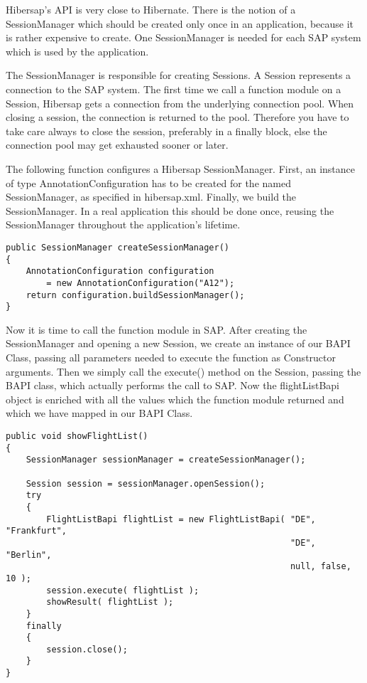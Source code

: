 Hibersap's API is very close to Hibernate.
There is the notion of a SessionManager which should be created only once in an application,
because it is rather expensive to create.
One SessionManager is needed for each SAP system which is used by the application.

The SessionManager is responsible for creating Sessions.
A Session represents a connection to the SAP system. The first time we call a function module
on a Session, Hibersap gets a connection from the underlying connection pool.
When closing a session, the connection is returned to the pool. Therefore you have to take care
always to close the session, preferably in a finally block, else the connection pool may
get exhausted sooner or later.

The following function configures a Hibersap SessionManager. First, an instance of type AnnotationConfiguration has to be created for the named SessionManager, as specified in hibersap.xml. Finally, we build the SessionManager. In a real application this should be done once, reusing the SessionManager throughout the application's lifetime.

\begin{lstlisting}[caption=Creating the SessionManager]
public SessionManager createSessionManager()
{
    AnnotationConfiguration configuration 
        = new AnnotationConfiguration("A12");
    return configuration.buildSessionManager();
}
\end{lstlisting}

Now it is time to call the function module in SAP.
After creating the SessionManager and opening a new Session, we create an instance of our
BAPI Class, passing all parameters needed to execute the function as Constructor arguments.
Then we simply call the execute() method on the Session, passing the BAPI class,
which actually performs the call to SAP. Now the flightListBapi object is enriched with all the
values which the function module returned and which we have mapped in our BAPI Class.

\begin{lstlisting}[caption=Executing the function]
public void showFlightList()
{
    SessionManager sessionManager = createSessionManager();

    Session session = sessionManager.openSession();
    try
    {
        FlightListBapi flightList = new FlightListBapi( "DE", "Frankfurt", 
                                                        "DE", "Berlin", 
                                                        null, false, 10 );
        session.execute( flightList );
        showResult( flightList );
    }
    finally
    {
        session.close();
    }
}
\end{lstlisting}

